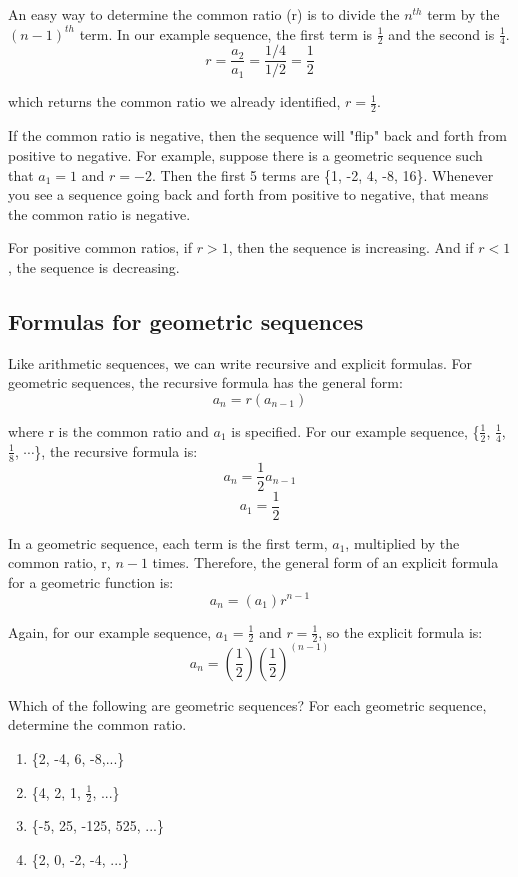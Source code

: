 An easy way to determine the common ratio (r) is to divide the 
$n^{th}$ term by the $(n-1)^{th}$ term. In our example sequence, 
the first term is $\frac{1}{2}$ and the second is $\frac{1}{4}$. 
$$r = \frac{a_2}{a_1} = \frac{1/4}{1/2} = \frac{1}{2}$$

which returns the common ratio we already identified, $r= \frac{1}{2}$. 

If the common ratio is negative, then the sequence will "flip" back 
and forth from positive to negative. For example, suppose there is a 
geometric sequence such that $a_1 = 1$ and $r = -2$. Then the first 5 
terms are \{1, -2, 4, -8, 16\}. Whenever you see a sequence going 
back and forth from positive to negative, that means the common ratio 
is negative. 

For positive common ratios, if $r>1$, then the sequence is increasing. 
And if $r<1$, the sequence is decreasing. 

\subsection{Formulas for geometric sequences}
Like arithmetic sequences, we can write recursive and explicit 
formulas. For geometric sequences, the recursive formula has the 
general form: 
$$a_n = r(a_{n-1})$$

where r is the common ratio and $a_1$ is specified. For our example 
sequence, \{$\frac{1}{2}$, $\frac{1}{4}$, $\frac{1}{8}$, $\cdots$\}, 
the recursive formula is:
$$a_n = \frac{1}{2}a_{n-1}$$
$$a_1 = \frac{1}{2}$$

In a geometric sequence, each term is the first term, $a_1$, 
multiplied by the common ratio, r, $n-1$ times. Therefore, the 
general form of an explicit formula for a geometric function is:
$$a_n = (a_1)r^{n-1}$$

Again, for our example sequence, $a_1 = \frac{1}{2}$ and $r = 
\frac{1}{2}$, so the explicit formula is:
$$a_n = (\frac{1}{2})(\frac{1}{2})^{(n-1)}$$

\begin{Exercise}[label=seq4]
Which of the following are geometric sequences? For each geometric 
sequence, determine the common ratio.
\begin{enumerate}
\item \{2, -4, 6, -8,...\}
\item \{4, 2, 1, $\frac{1}{2}$, ...\}
\item \{-5, 25, -125, 525, ...\}
\item \{2, 0, -2, -4, ...\}
\end{enumerate}
\end{Exercise}

